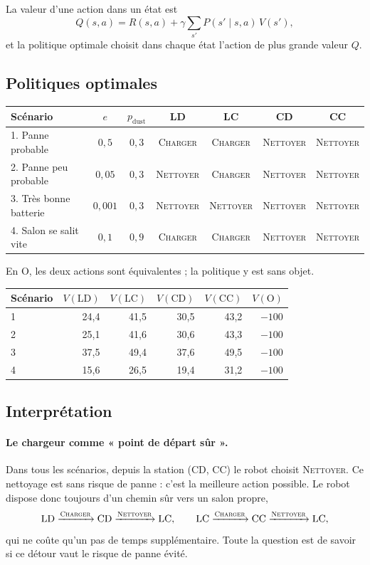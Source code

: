 \documentclass[11pt,a4paper]{article}
\newcommand{\N}{\textsc{Nettoyer}}
\newcommand{\C}{\textsc{Charger}}
\newcommand{\pd}{p_{\text{dust}}}
\begin{document}
La valeur d'une action dans un état est
\[
Q(s,a) = R(s,a) + \gamma \sum_{s'} P(s' \mid s,a)\, V(s'),
\]
et la politique optimale choisit dans chaque état l'action de plus grande valeur $Q$.

\subsection{Politiques optimales}

\begin{center}
\begin{tabular}{l c c c c c c}
\toprule
Scénario & $e$ & $\pd$ & LD & LC & CD & CC \\
\midrule
1. Panne probable & $0{,}5$ & $0{,}3$ & \C & \C & \N & \N \\
2. Panne peu probable & $0{,}05$ & $0{,}3$ & \N & \C & \N & \N \\
3. Très bonne batterie & $0{,}001$ & $0{,}3$ & \N & \N & \N & \N \\
4. Salon se salit vite & $0{,}1$ & $0{,}9$ & \C & \C & \N & \N \\
\bottomrule
\end{tabular}
\end{center}

En O, les deux actions sont équivalentes ; la politique y est sans objet.

\begin{center}
\begin{tabular}{l r r r r r}
\toprule
Scénario & $V(\text{LD})$ & $V(\text{LC})$ & $V(\text{CD})$ & $V(\text{CC})$ & $V(\text{O})$ \\
\midrule
1 & 24,4 & 41,5 & 30,5 & 43,2 & $-100$ \\
2 & 25,1 & 41,6 & 30,6 & 43,3 & $-100$ \\
3 & 37,5 & 49,4 & 37,6 & 49,5 & $-100$ \\
4 & 15,6 & 26,5 & 19,4 & 31,2 & $-100$ \\
\bottomrule
\end{tabular}
\end{center}

\subsection{Interprétation}

\paragraph{Le chargeur comme « point de départ sûr ».}
Dans tous les scénarios, depuis la station (CD, CC) le robot choisit \N. Ce nettoyage est sans risque de panne :
c'est la meilleure action possible. Le robot dispose donc toujours d'un chemin sûr vers un salon propre,
\[
\text{LD} \xrightarrow{\C} \text{CD} \xrightarrow{\N} \text{LC},
\qquad
\text{LC} \xrightarrow{\C} \text{CC} \xrightarrow{\N} \text{LC},
\]
qui ne coûte qu'un pas de temps supplémentaire. Toute la question est de savoir si ce détour vaut le risque
de panne évité.
\end{document}
